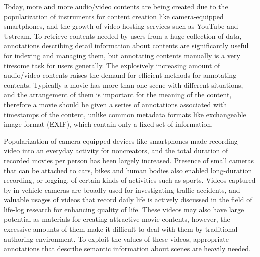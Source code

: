 Today, more and more audio/video contents are being created due to the popularization of instruments for content creation like camera-equipped smartphones, and the growth of video hosting services such as YouTube and Ustream.
To retrieve contents needed by users from a huge collection of data, annotations describing detail information about contents are significantly useful for indexing and managing them, but annotating contents manually is a very tiresome task for users generally.
The explosively increasing amount of audio/video contents raises the demand for efficient methods for annotating contents.
Typically a movie has more than one scene with different situations, and the arrangement of them is important for the meaning of the content, therefore a movie should be given a series of annotations associated with timestamps of the content, unlike common metadata formats like exchangeable image format (EXIF), which contain only a fixed set of information.

Popularization of camera-equipped devices like smartphones made recording video into an everyday activity for noncreators, and the total duration of recorded movies per person has been largely increased.
Presence of small cameras that can be attached to cars, bikes and human bodies also enabled long-duration recording, or logging, of certain kinds of activities such as sports.
Videos captured by in-vehicle cameras are broadly used for investigating traffic accidents, and valuable usages of videos that record daily life is actively discussed in the field of life-log research for enhancing quality of life.
These videos may also have large potential as materials for creating attractive movie contents, however, the excessive amounts of them make it difficult to deal with them by traditional authoring environment.
To exploit the values of these videos, appropriate annotations that describe semantic information about scenes are heavily needed.

